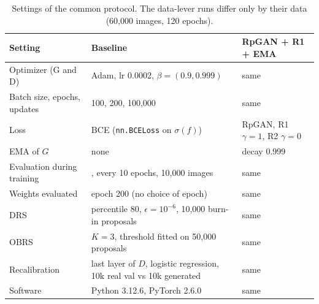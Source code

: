 \begin{table}[H]
\centering
\footnotesize
\setlength{\tabcolsep}{4pt}
\begin{tabular}{p{3.2cm}p{6.2cm}p{4.6cm}}
\toprule
Setting & Baseline & RpGAN + R1 + EMA \\
\midrule
Optimizer (G and D) & Adam, lr 0.0002, $\beta=(0.9, 0.999)$ & same \\
Batch size, epochs, updates & 100, 200, 100,000 & same \\
Loss & BCE (\texttt{nn.BCELoss} on $\sigma(f)$) & RpGAN, R1 $\gamma=1$, R2 $\gamma=0$ \\
EMA of $G$ & none & decay 0.999 \\
Evaluation during training & \fcnn{}, every 10 epochs, 10,000 images & same \\
Weights evaluated & epoch 200 (no choice of epoch) & same \\
DRS & percentile 80, $\epsilon=10^{-6}$, 10,000 burn-in proposals & same \\
OBRS & $K=3$, threshold fitted on 50,000 proposals & same \\
Recalibration & last layer of $D$, logistic regression, 10k real val vs 10k generated & same \\
Software & Python 3.12.6, PyTorch 2.6.0 & same \\
\bottomrule
\end{tabular}
\caption{Settings of the common protocol. The data-lever runs differ only by their data (60,000 images, 120 epochs).}
\label{tab:supp-hyper}
\end{table}

